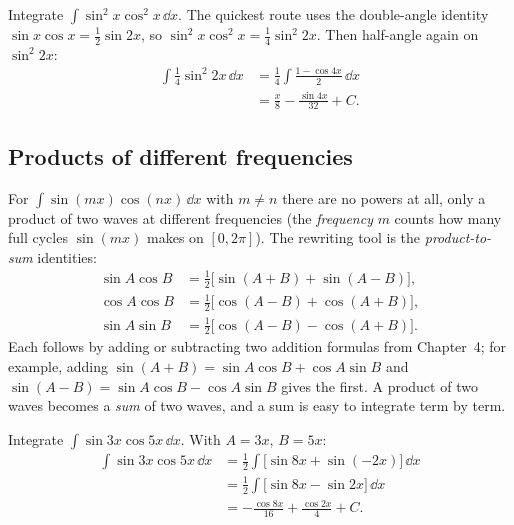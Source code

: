 \begin{example}
Integrate $\displaystyle \int \sin^2 x\cos^2 x\,\dd x.$ The quickest route uses the double-angle identity
$\sin x\cos x = \tfrac{1}{2}\sin 2x$, so $\sin^2 x\cos^2 x =
\tfrac{1}{4}\sin^2 2x$. Then half-angle again on $\sin^2 2x$:
\begin{align*}
\int \tfrac{1}{4}\sin^2 2x\,\dd x
&= \frac{1}{4}\int \frac{1 - \cos 4x}{2}\,\dd x\\
&= \frac{x}{8} - \frac{\sin 4x}{32} + C.
\end{align*}
\end{example}

\subsection{Products of different frequencies}

For $\int \sin(mx)\cos(nx)\,\dd x$ with $m \neq n$ there are no powers at all,
only a product of two waves at different frequencies (the \emph{frequency} $m$
counts how many full cycles $\sin(mx)$ makes on $[0,2\pi]$). The rewriting tool
is the \emph{product-to-sum} identities:
\begin{align*}
\sin A\cos B &= \tfrac{1}{2}\big[\sin(A+B) + \sin(A-B)\big],\\
\cos A\cos B &= \tfrac{1}{2}\big[\cos(A-B) + \cos(A+B)\big],\\
\sin A\sin B &= \tfrac{1}{2}\big[\cos(A-B) - \cos(A+B)\big].
\end{align*}
Each follows by adding or subtracting two addition formulas from Chapter~4;
for example, adding $\sin(A+B) = \sin A\cos B + \cos A\sin B$ and
$\sin(A-B) = \sin A\cos B - \cos A\sin B$ gives the first. A product of two
waves becomes a \emph{sum} of two waves, and a sum is easy to integrate term by
term.

\begin{example}
Integrate $\displaystyle \int \sin 3x\cos 5x\,\dd x$. With $A = 3x$, $B = 5x$:
\begin{align*}
\int \sin 3x\cos 5x\,\dd x
&= \frac{1}{2}\int \big[\sin 8x + \sin(-2x)\big]\,\dd x\\
&= \frac{1}{2}\int \big[\sin 8x - \sin 2x\big]\,\dd x\\
&= -\frac{\cos 8x}{16} + \frac{\cos 2x}{4} + C.
\end{align*}
\end{example}

